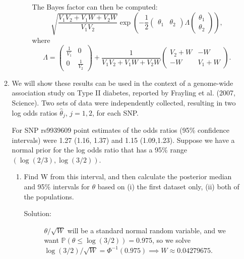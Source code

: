\documentclass[letterpaper,11pt]{article}
\begin{document}
\begin{enumerate}
\begin{enumerate}
\begin{description}
      The Bayes factor can then be computed:
      \begin{equation}
        \sqrt{\frac{V_1V_2 + V_1W + V_2W}{V_1V_2}}
        \exp\left(
          -\frac{1}{2}
          \begin{pmatrix}
            \theta_1 & \theta_2
          \end{pmatrix}
          \Lambda
          \begin{pmatrix}
            \theta_1 \\ \theta_2
          \end{pmatrix}
        \right),
      \end{equation}
      where \begin{equation}
        \Lambda =
        \begin{pmatrix}
          \frac{1}{V_1} & 0 \\
          0 & \frac{1}{V_2}
        \end{pmatrix}
        + \frac{1}{V_1V_2 + V_1W + V_2W}
        \begin{pmatrix}
          V_2 + W & -W \\
          -W & V_1 + W
        \end{pmatrix}.
      \end{equation}
    \end{description}
  \item We will show these results can be used in the context of a genome-wide
    association study on Type II diabetes, reported by Frayling et al. (2007,
    Science). Two sets of data were independently collected, resulting in two
    log odds ratios $\hat{\theta}_j$, $j = 1,2$, for each SNP.
     
    For SNP rs9939609 point estimates of the odds ratios (95\% confidence
    intervals) were 1.27 (1.16, 1.37) and 1.15 (1.09,1.23). Suppose we have a
    normal prior for the log odds ratio that has a 95\% range
    $\left(\log\left(2/3\right), \log\left(3/2\right)\right)$.

    \begin{enumerate}
    \item Find W from this interval, and then calculate the posterior median and
      95\% intervals for $\theta$ based on (i) the first dataset only, (ii) both
      of the populations.
      \begin{description}
      \item[Solution:] $\theta/\sqrt{W}$ will be a standard normal random
        variable, and we want
        $\mathbb{P}\left(\theta \leq \log\left(3/2\right)\right) = 0.975$, so we
        solve
        $\log\left(3/2\right)/\sqrt{W} = \Phi^{-1}\left(0.975\right) \implies W
        \approx 0.04279675$.


\end{description}
\end{enumerate}
\end{enumerate}
\end{enumerate}
\end{document}

